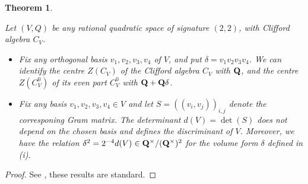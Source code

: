 \documentclass{amsart}
\newtheorem{theorem}{Theorem}[section]
\theoremstyle{definition}
\begin{document}
\begin{theorem}\label{Clifford} 

Let $(V, Q)$ be any rational quadratic space of signature $(2,2)$, with Clifford algebra $C_V$. \\

\begin{itemize}

\item[(i)] Fix any orthogonal basis $v_1, v_2, v_3, v_4$ of $V$, and put $\delta = v_1 v_2 v_3 v_4$. 
We can identify the centre $Z(C_V)$ of the Clifford algebra $C_V$ with ${\bf{Q}}$, 
and the centre $Z(C_V^0)$ of its even part $C_V^0$ with ${\bf{Q} + {\bf{Q}}} \delta$. \\

\item[(ii)] Fix any basis $v_1, v_2, v_3, v_4 \in V$ and let $S = ((v_i, v_j))_{i, j}$ denote the corresponing Gram matrix.
The determinant $d(V) = \det(S)$ does not depend on the chosen basis and defines the discriminant of $V$.
Moreover, we have the relation $\delta^2 = 2^{-4} d(V) \in {\bf{Q}}^{\times}/({\bf{Q}}^{\times})^2$ for the volume form $\delta$ defined in (i). \\

\end{itemize}

\end{theorem}

\begin{proof} See \cite[$\S$ 2.2, Theorem 2.6 and Remark 2.5]{Br}, these results are standard. \end{proof}
\end{document}
